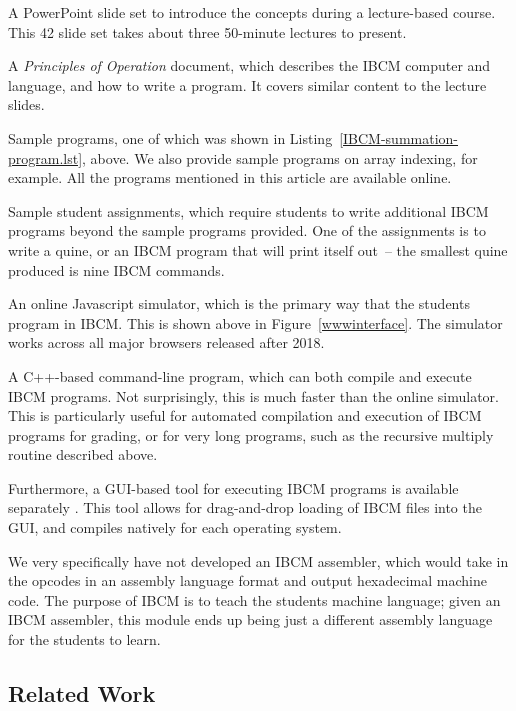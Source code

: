 \begin{itemlist}
\item A PowerPoint slide set to introduce the concepts during a
  lecture-based course.  This 42 slide set takes about three 50-minute
  lectures to present.
\item A {\em Principles of Operation} document, which describes the
  IBCM computer and language, and how to write a program.
  It covers similar content to the lecture slides.
\item Sample programs, one of which was shown in
  Listing~\ref{IBCM-summation-program.lst}, above.  We also provide sample programs
  on array indexing, for example.  All the programs mentioned in this
  article are available online.
\item Sample student assignments, which require students to
  write additional IBCM programs beyond the sample programs provided.
  One of the assignments is to write a quine, or an IBCM program that
  will print itself out~-- the smallest quine produced is nine IBCM
  commands.
\item An online Javascript simulator, which is the primary way that
  the students program in IBCM.  This is shown above in
  Figure~\ref{wwwinterface}.  The simulator works across all major
  browsers released after 2018.
\item A C++-based command-line program, which can both compile and
  execute IBCM programs.  Not surprisingly, this is much faster than
  the online simulator.  This is particularly useful for automated
  compilation and execution of IBCM programs for grading, or for very
  long programs, such as the recursive multiply routine described
  above.
\end{itemlist}

Furthermore, a GUI-based tool for executing IBCM programs is available
separately \cite{jwelsh-ibcm}.
This tool allows for drag-and-drop loading of IBCM files into the
GUI, and compiles natively for each operating system.


We very specifically have not developed an IBCM assembler, which would
take in the opcodes in an assembly language format and output
hexadecimal machine code.  The purpose of IBCM is to teach the
students machine language; given an IBCM assembler, this module ends
up being just a different assembly language for the students to learn.

\subsection{Related Work}

